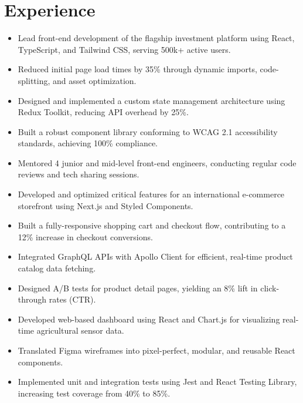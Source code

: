 \section{Experience}

\begin{itemize}[leftmargin=*, noitemsep]
    \item Lead front-end development of the flagship investment platform using React, TypeScript, and Tailwind CSS, serving 500k+ active users.
    \item Reduced initial page load times by 35\% through dynamic imports, code-splitting, and asset optimization.
    \item Designed and implemented a custom state management architecture using Redux Toolkit, reducing API overhead by 25\%.
    \item Built a robust component library conforming to WCAG 2.1 accessibility standards, achieving 100\% compliance.
    \item Mentored 4 junior and mid-level front-end engineers, conducting regular code reviews and tech sharing sessions.
\end{itemize}

\vspace{6pt}

\begin{itemize}[leftmargin=*, noitemsep]
    \item Developed and optimized critical features for an international e-commerce storefront using Next.js and Styled Components.
    \item Built a fully-responsive shopping cart and checkout flow, contributing to a 12\% increase in checkout conversions.
    \item Integrated GraphQL APIs with Apollo Client for efficient, real-time product catalog data fetching.
    \item Designed A/B tests for product detail pages, yielding an 8\% lift in click-through rates (CTR).
\end{itemize}

\vspace{6pt}

\begin{itemize}[leftmargin=*, noitemsep]
    \item Developed web-based dashboard using React and Chart.js for visualizing real-time agricultural sensor data.
    \item Translated Figma wireframes into pixel-perfect, modular, and reusable React components.
    \item Implemented unit and integration tests using Jest and React Testing Library, increasing test coverage from 40\% to 85\%.
\end{itemize}

